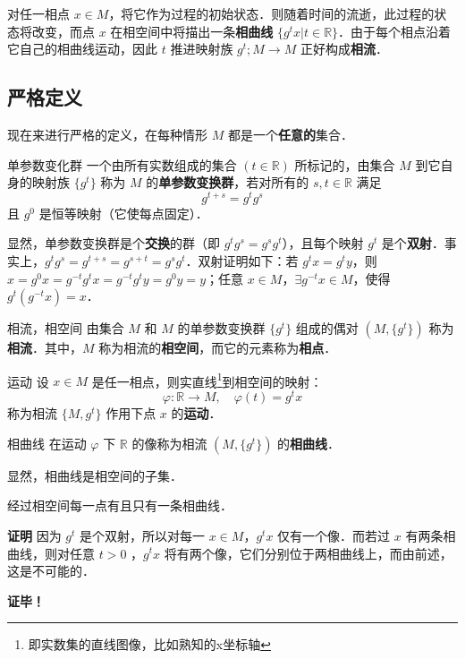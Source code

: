 对任一相点 $x\in M$，将它作为过程的初始状态．则随着时间的流逝，此过程的状态将改变，而点 $x$ 在相空间中将描出一条\textbf{相曲线} $\{g^tx|t\in \mathbb R\}$．由于每个相点沿着它自己的相曲线运动，因此 $t$ 推进映射族 $g^t;M\rightarrow M$ 正好构成\textbf{相流}． 
\subsection{严格定义}
现在来进行严格的定义，在每种情形 $M$ 都是一个\textbf{任意的}集合．
\begin{definition}{单参数变化群}
一个由所有实数组成的集合 $(t\in \mathbb R)$ 所标记的，由集合 $M$ 到它自身的映射族 $\{g^t\}$ 称为 $M$ 的\textbf{单参数变换群}，若对所有的 $s,t\in\mathbb R$ 满足
\begin{equation}
g^{t+s}=g^tg^s
\end{equation}
 且 $g^0$ 是恒等映射（它使每点固定）．
\end{definition}
显然，单参数变换群是个\textbf{交换}的群（即 $g^tg^s=g^sg^t$），且每个映射 $g^t$ 是个\textbf{双射}．事实上，$g^tg^s=g^{t+s}=g^{s+t}=g^sg^t$．双射证明如下：若 $g^t x=g^t y$，则 $x=g^0x=g^{-t}g^tx=g^{-t}g^ty=g^0y=y$；任意 $x\in M$，$\exists g^{-t}x\in M$，使得 $g^t(g^{-t}x)=x$．
\begin{definition}{相流，相空间}
由集合 $M$ 和 $M$ 的单参数变换群 $\{g^t\}$ 组成的偶对 $(M,\{g^t\})$ 称为\textbf{相流}．其中，$M$ 称为相流的\textbf{相空间}，而它的元素称为\textbf{相点}．
\end{definition}
\begin{definition}{运动}
设 $x\in M$ 是任一相点，则实直线\footnote{即实数集的直线图像，比如熟知的x坐标轴}到相空间的映射：
\begin{equation}
\varphi:\mathbb R\rightarrow M,\quad \varphi(t)=g^tx
\end{equation}
称为相流 $\{M,{g^t}\}$ 作用下点 $x$ 的\textbf{运动}．
\end{definition}
\begin{definition}{相曲线}
在运动 $\varphi$ 下 $\mathbb R$ 的像称为相流 $(M,\{g^t\})$ 的\textbf{相曲线}．
\end{definition}
显然，相曲线是相空间的子集．
\begin{theorem}{}
经过相空间每一点有且只有一条相曲线．
\end{theorem}
\textbf{证明}
因为 $g^t$ 是个双射，所以对每一 $x\in M$，$g^t x$ 仅有一个像．而若过 $x$ 有两条相曲线，则对任意 $t>0$ ，$g^tx$ 将有两个像，它们分别位于两相曲线上，而由前述，这是不可能的．

\textbf{证毕！}